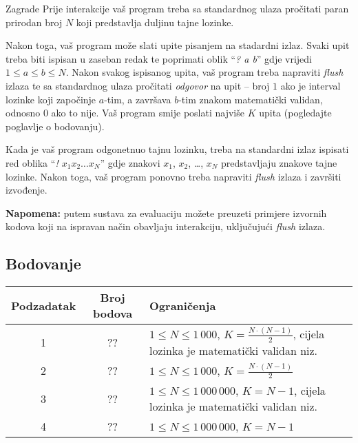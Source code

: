 \begin{statement}[
  problempoints=100,
  timelimit=1 sekunda,
  memorylimit=512 MiB,
]{Zagrade}
Prije interakcije vaš program treba sa standardnog ulaza pročitati paran
prirodan broj $N$ koji predstavlja duljinu tajne lozinke.

Nakon toga, vaš program može slati upite pisanjem na stadardni izlaz. Svaki
upit treba biti ispisan u zaseban redak te poprimati oblik ``\textit{? a b}''
gdje vrijedi $1 \le a \le b \le N$. Nakon svakog ispisanog upita, vaš program
treba napraviti \textit{flush} izlaza te sa standardnog ulaza pročitati
\textit{odgovor} na upit -- broj $1$ ako je interval lozinke koji započinje
$a$-tim, a završava $b$-tim znakom matematički validan, odnosno $0$ ako to
nije. Vaš program smije poslati najviše $K$ upita (pogledajte poglavlje o
bodovanju).

Kada je vaš program odgonetnuo tajnu lozinku, treba na standardni izlaz
ispisati red oblika ``\textit{! $x_1x_2\dots x_N$}'' gdje znakovi $x_1$,
$x_2$, \dots, $x_N$ predstavljaju znakove tajne lozinke. Nakon toga, vaš
program ponovno treba napraviti \textit{flush} izlaza i završiti izvođenje.

\textbf{Napomena:} putem sustava za evaluaciju možete preuzeti primjere
izvornih kodova koji na ispravan način obavljaju interakciju, uključujući
\textit{flush} izlaza.

\subsection*{Bodovanje}
{\renewcommand{\arraystretch}{1.4}
  \setlength{\tabcolsep}{6pt}
  \begin{tabular}{ccl}
 Podzadatak & Broj bodova & Ograničenja \\ \midrule
    1 & ?? & $1 \le N \le 1\,000$, $K = \frac{N\cdot(N-1)}{2}$, cijela lozinka je matematički validan niz. \\
    2 & ?? & $1 \le N \le 1\,000$, $K = \frac{N\cdot(N-1)}{2}$ \\
    3 & ?? & $1 \le N \le 1\,000\,000 $, $K = N - 1$, cijela lozinka je matematički validan niz. \\
    4 & ?? & $1 \le N \le 1\,000\,000 $, $K = N - 1$ \\
\end{tabular}}


\end{statement}
